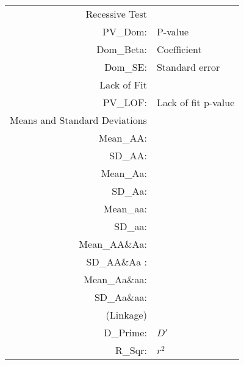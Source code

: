 \begin{supertabular}{r p{5in}}
   Recessive Test & ~ \\
      PV\_Dom: & P-value \\
      Dom\_Beta: & Coefficient \\
      Dom\_SE: & Standard error \\[1em]

   Lack of Fit & ~ \\
      PV\_LOF: & Lack of fit p-value \\[1em]

   Means and Standard Deviations & ~ \\
      Mean\_AA: & \\
      SD\_AA: & \\
      Mean\_Aa: & \\
      SD\_Aa: & \\
      Mean\_aa: & \\
      SD\_aa: &  \\
      Mean\_AA\&Aa: &  \\
      SD\_AA\&Aa : & \\
      Mean\_Aa\&aa: &  \\
      SD\_Aa\&aa: &  \\ [1em]

   (Linkage) & ~ \\
      D\_Prime: & $D'$ \\
      R\_Sqr: & $r^2$  \\
 
\end{supertabular}
